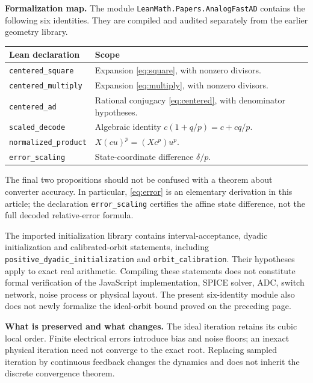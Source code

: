 \documentclass[11pt,a4paper]{article}
\begin{document}
\textbf{Formalization map.} The module
\texttt{LeanMath.Papers.AnalogFastAD} contains the following six identities. They are compiled and audited separately from the earlier geometry library.
\begin{center}\small
\begin{tabularx}{\linewidth}{@{}lX@{}}\toprule
Lean declaration & Scope \\ \midrule
\texttt{centered\_square} & Expansion \eqref{eq:square}, with nonzero divisors.\\
\texttt{centered\_multiply} & Expansion \eqref{eq:multiply}, with nonzero divisors.\\
\texttt{centered\_ad} & Rational conjugacy \eqref{eq:centered}, with denominator hypotheses.\\
\texttt{scaled\_decode} & Algebraic identity $c(1+q/p)=c+cq/p$.\\
\texttt{normalized\_product} & $X(cu)^p=(Xc^p)u^p$.\\
\texttt{error\_scaling} & State-coordinate difference $\delta/p$.\\\bottomrule
\end{tabularx}\end{center}
The final two propositions should not be confused with a theorem about converter accuracy. In particular, \eqref{eq:error} is an elementary derivation in this article; the declaration \texttt{error\_scaling} certifies the affine state difference, not the full decoded relative-error formula.

The imported initialization library contains interval-acceptance, dyadic initialization and calibrated-orbit statements, including \texttt{positive\_dyadic\_initialization} and \texttt{orbit\_calibration}. Their hypotheses apply to exact real arithmetic. Compiling these statements does not constitute formal verification of the JavaScript implementation, SPICE solver, ADC, switch network, noise process or physical layout. The present six-identity module also does not newly formalize the ideal-orbit bound proved on the preceding page.

\textbf{What is preserved and what changes.} The ideal iteration retains its cubic local order. Finite electrical errors introduce bias and noise floors; an inexact physical iteration need not converge to the exact root. Replacing sampled iteration by continuous feedback changes the dynamics and does not inherit the discrete convergence theorem.
\clearpage
\end{document}
